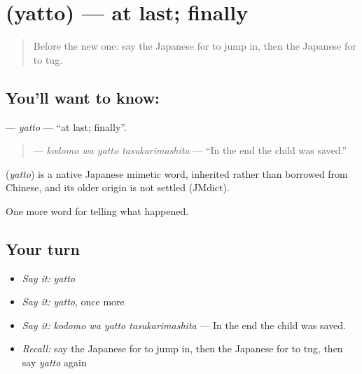\section[\texorpdfstring{\ja{やっと} (yatto)}{やっと (yatto)}]{ (yatto) — at last; finally}

\label{lesson:JA-C266-yatto}



\begin{quote}
Before the new one: say the Japanese for to jump in, then the Japanese for to tug.
\end{quote}

\subsection*{You'll want to know: }
\textbf{} — \emph{yatto} — \textquotedblleft{}at last; finally\textquotedblright{}.

\begin{quote}
\textbf{  } — \emph{kodomo wa yatto tasukarimashita} — \textquotedblleft{}In the end the child was saved.\textquotedblright{}
\end{quote}

\begin{cousinweb}
\textbf{} (\emph{yatto}) is a native Japanese mimetic word, inherited rather than borrowed from Chinese, and its older origin is not settled (JMdict).
\end{cousinweb}

\begin{grammarlens}[title={What you've built}]
One more word for telling what happened.
\end{grammarlens}

\subsection*{Your turn}
\begin{itemize}
\raggedright
  \item \emph{Say it:} \emph{yatto}
  \item \emph{Say it:} \emph{yatto}, once more
  \item \emph{Say it:} \emph{kodomo wa yatto tasukarimashita} — In the end the child was saved.
  \item \emph{Recall:} say the Japanese for to jump in, then the Japanese for to tug, then say \emph{yatto} again
\end{itemize}

